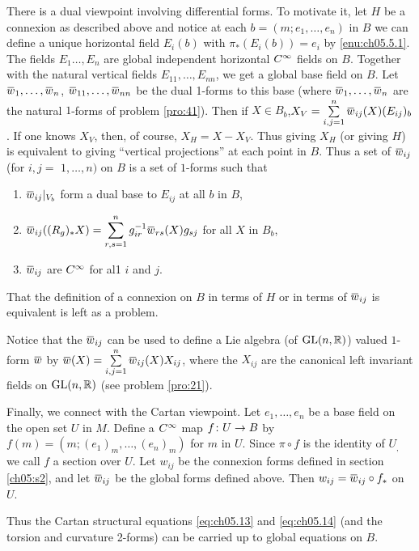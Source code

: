 \documentclass[../main]{subfiles}
\begin{document}
There is a dual viewpoint involving differential forms. To motivate it, let $H$ be a connexion as described above and notice at each $b=\left(m ; e_{1}, \ldots, e_{n}\right)$ in $B$ we can define a unique horizontal field $E_{i}(b)$ with $\pi_{\ast}\left(E_{i}(b)\right)=e_{i}$ by \ref{enu:ch05.5.1}. The fields $E_{1} \ldots, E_{n}$ are global independent horizontal $C^\infty$ fields on $B$. Together with the natural vertical fields $E_{11}, \ldots, E_{n n}$, we get a global base field on $B$. Let $\xoverline{w}_{1}, \ldots, \xoverline{w}_{n}$, $\xoverline{w}_{11}, \ldots, \xoverline{w}_{n n}$ be the dual 1-forms to this base (where $\xoverline{w}_{1}, \ldots, \xoverline{w}_{n}$ are the natural $1$-forms of problem \ref{pro:41}). Then if $X\in B_{b}$,$ X_{V}=\sum\limits_{i, j=1}^{n} \xoverline{w}_{i j}(X)(E_{i j})_{b}$. If one knows $X_{V}$, then, of course, $X_{H}=X-X_{V}$. Thus giving $X_{H}$ (or giving $H$) is equivalent to giving ``vertical projections'' at each point in $B$. Thus a set of  $\xoverline{w}_{i j}$ (for $i, j=$ $1, \ldots, n)$ on $B$ is a set of $1$-forms such that

\begin{enumerate}
\item[(1')] $\xoverline{w}_{i j}\vert_{V_{b}}$ form a dual base to $E_{i j}$ at all $b$ in $B$,

\item[(2')]$ \xoverline{w}_{i j}((R_{g})_{\ast} X)=\displaystyle\sum\limits_{r,s=1}^{n} g_{i r}^{-1} \xoverline{w}_{r s}(X) g_{s j}$ for all $X$ in $B_{b}$,

\item[(3')]$ \xoverline{w}_{i j}$ are $C^\infty$ for al1 $i$ and $j .$
\end{enumerate}
That the definition of a connexion on $B$ in terms of $H$ or in terms of $\xoverline{w}_{i j}$ is equivalent is left as a problem.

Notice that the $\xoverline{w}_{i j}$ can be used to define a Lie algebra (of $\mathrm{GL}(n, \mathbb{R})$) valued $1$-form $\xoverline{w}$ by $\xoverline{w}(X)=\sum\limits_{i, j=1}^{n} \xoverline{w}_{i j}(X) X_{i j}$, where the $X_{i j}$ are the canonical left invariant fields on $\mathrm{GL}(n, \mathbb{R})$ (see problem \ref{pro:21}).

Finally, we connect with the Cartan viewpoint. Let $e_{1}, \ldots, e_{n}$ be a base field on the open set $U$ in $M$. Define a $C^\infty$ map $f\colon U \to B$ by $f(m)=\left(m ;\left(e_{1}\right)_{m}, \ldots,\left(e_{n}\right)_{m}\right)$ for $m$ in $U$. Since $\pi \circ f$ is the identity of $U_{,}$ we call $f$ a section over $U$. Let $w_{i j}$ be the connexion forms defined in section \ref{ch05:s2}, and let $\xoverline{w}_{i j}$ be the global forms defined above. Then $w_{i j}=\xoverline{w}_{i j} \circ f_{\ast}$ on $U$.

Thus the Cartan structural equations \ref{eq:ch05.13} and \ref{eq:ch05.14} (and the torsion and curvature 2-forms) can be carried up to global equations on $B$.
\end{document}
